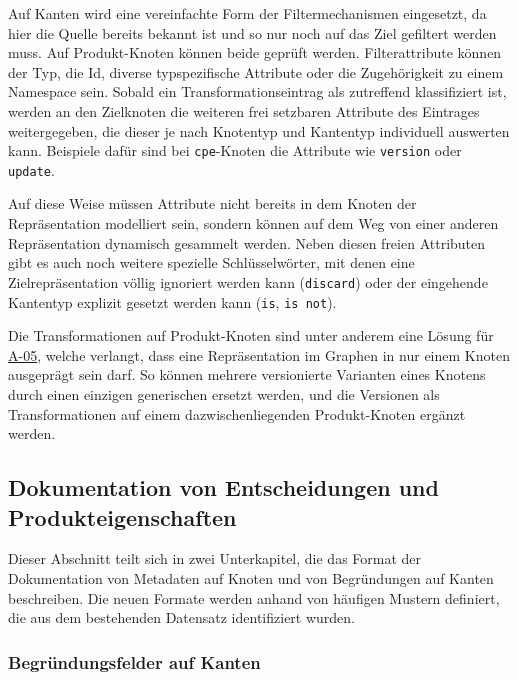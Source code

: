 Auf Kanten wird eine vereinfachte Form der Filtermechanismen eingesetzt, da hier die Quelle bereits bekannt ist und so nur noch auf das Ziel gefiltert werden muss.
Auf Produkt-Knoten können beide geprüft werden.
Filterattribute können der Typ, die Id, diverse typspezifische Attribute oder die Zugehörigkeit zu einem Namespace sein.
Sobald ein Transformationseintrag als zutreffend klassifiziert ist, werden an den Zielknoten die weiteren frei setzbaren Attribute des Eintrages weitergegeben, die dieser je nach Knotentyp und Kantentyp individuell auswerten kann.
Beispiele dafür sind bei \texttt{cpe}-Knoten die Attribute wie \texttt{version} oder \texttt{update}.

Auf diese Weise müssen Attribute nicht bereits in dem Knoten der Repräsentation modelliert sein, sondern können auf dem Weg von einer anderen Repräsentation dynamisch gesammelt werden.
Neben diesen freien Attributen gibt es auch noch weitere spezielle Schlüsselwörter, mit denen eine Zielrepräsentation völlig ignoriert werden kann (\texttt{discard}) oder der eingehende Kantentyp explizit gesetzt werden kann (\texttt{is}, \texttt{is not}).

Die Transformationen auf Produkt-Knoten sind unter anderem eine Lösung für \hyperref[subsec:req-unique-product-representations]{A-05}, welche verlangt, dass eine Repräsentation im Graphen in nur einem Knoten ausgeprägt sein darf.
So können mehrere versionierte Varianten eines Knotens durch einen einzigen generischen ersetzt werden, und die Versionen als Transformationen auf einem dazwischenliegenden Produkt-Knoten ergänzt werden.

\subsection{Dokumentation von Entscheidungen und Produkteigenschaften}\label{subsec:model-rationale}

Dieser Abschnitt teilt sich in zwei Unterkapitel, die das Format der Dokumentation von Metadaten auf Knoten und von Begründungen auf Kanten beschreiben.
Die neuen Formate werden anhand von häufigen Mustern definiert, die aus dem bestehenden Datensatz identifiziert wurden.

\subsubsection{Begründungsfelder auf Kanten}

